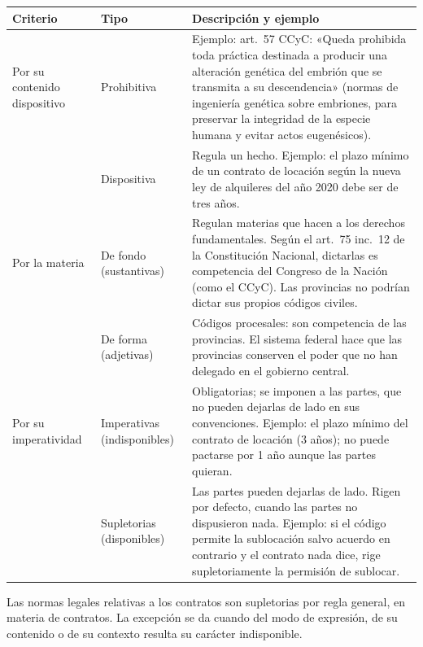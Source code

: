 \documentclass[12pt,oneside]{book}
\begin{document}
\begin{table}[H]
\centering
\begin{tabularx}{\textwidth}{>{\raggedright\arraybackslash}p{} >{\raggedright\arraybackslash}p{} >{\raggedright\arraybackslash}X}
\toprule
\textbf{Criterio} & \textbf{Tipo} & \textbf{Descripción y ejemplo} \\
\midrule
Por su contenido dispositivo & Prohibitiva &
Ejemplo: art.~57 CCyC: «Queda prohibida toda práctica destinada a producir una alteración genética del embrión que se transmita a su descendencia» (normas de ingeniería genética sobre embriones, para preservar la integridad de la especie humana y evitar actos eugenésicos). \\
\addlinespace
& Dispositiva &
Regula un hecho. Ejemplo: el plazo mínimo de un contrato de locación según la nueva ley de alquileres del año 2020 debe ser de tres años. \\
\midrule
Por la materia & De fondo (sustantivas) &
Regulan materias que hacen a los derechos fundamentales. Según el art.~75 inc.~12 de la Constitución Nacional, dictarlas es competencia del Congreso de la Nación (como el CCyC). Las provincias no podrían dictar sus propios códigos civiles. \\
\addlinespace
& De forma (adjetivas) &
Códigos procesales: son competencia de las provincias. El sistema federal hace que las provincias conserven el poder que no han delegado en el gobierno central. \\
\midrule
Por su imperatividad & Imperativas (indisponibles) &
Obligatorias; se imponen a las partes, que no pueden dejarlas de lado en sus convenciones. Ejemplo: el plazo mínimo del contrato de locación (3 años); no puede pactarse por 1 año aunque las partes quieran. \\
\addlinespace
& Supletorias (disponibles) &
Las partes pueden dejarlas de lado. Rigen por defecto, cuando las partes no dispusieron nada. Ejemplo: si el código permite la sublocación salvo acuerdo en contrario y el contrato nada dice, rige supletoriamente la permisión de sublocar. \\
\bottomrule
\end{tabularx}
\end{table}

\begin{regla}
Las normas legales relativas a los contratos son supletorias por regla general, en materia de contratos. La excepción se da cuando del modo de expresión, de su contenido o de su contexto resulta su carácter indisponible.
\end{regla}
\end{document}
